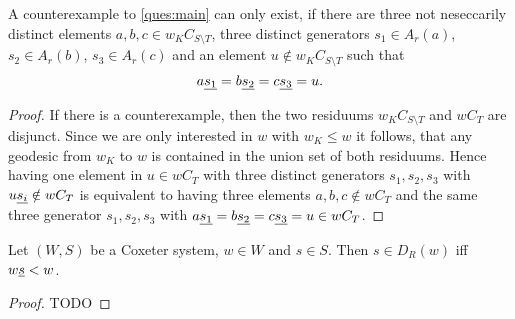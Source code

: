 \begin{lemm}
	A counterexample to \ref{ques:main} can only exist, if there are three not
	neseccarily distinct elements $a,b,c \in w_K C_{S \setminus T}$, three
	distinct generators $s_1 \in A_r(a)$, $s_2 \in A_r(b)$, $s_3 \in A_r(c)$ and an
	element $u \notin w_K C_{S \setminus T}$ such that
	$$ a \underline{s_1} = b \underline{s_2} = c \underline{s_3} = u. $$

	\begin{proof}
		If there is a counterexample, then the two residuums $w_K C_{S \setminus T}$ and
		$w C_T$ are disjunct. Since we are only interested in $w$ with $w_K \leq w$
		it follows, that any geodesic from $w_K$ to $w$ is contained in the union set
		of both residuums. Hence having one element in $u \in w C_T$ with three distinct
		generators $s_1,s_2,s_3$ with $u \underline{s_i} \notin w C_T$ is equivalent to having
		three elements $a,b,c \notin w C_T$ and the same three generator $s_1,s_2,s_3$
		with $a \underline{s_1} = b \underline{s_2} = c \underline{s_3} = u \in w C_T$.
	\end{proof}
\end{lemm}

\begin{lemm}
	Let $(W,S)$ be a Coxeter system, $w \in W$ and $s \in S$. Then $s \in D_R(w)$ iff $w \underline{s} < w$.

	\begin{proof}
		TODO
	\end{proof}
\end{lemm}